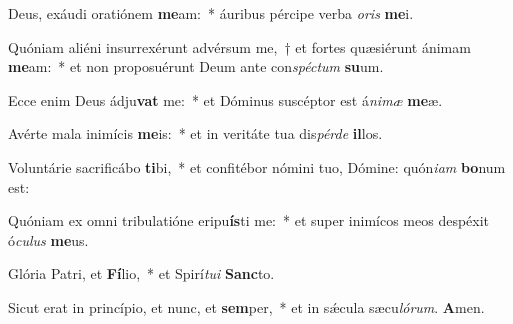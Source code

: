 \vs Deus, exáudi oratiónem \textbf{me}am:~* áuribus pércipe verba \textit{o}\textit{ris} \textbf{me}i.

\vs Quóniam aliéni insurrexérunt advérsum me,~† et fortes quæsiérunt ánimam \textbf{me}am:~* et non proposuérunt Deum ante con\textit{spéc}\textit{tum} \textbf{su}um.

\vs Ecce enim Deus ádju\textbf{vat} me:~* et Dóminus suscéptor est á\textit{ni}\textit{mæ} \textbf{me}æ.

\vs Avérte mala inimícis \textbf{me}is:~* et in veritáte tua dis\textit{pér}\textit{de} \textbf{il}los.

\vs Voluntárie sacrificábo \textbf{ti}bi,~* et confitébor nómini tuo, Dómine: quón\textit{i}\textit{am} \textbf{bo}num est:

\vs Quóniam ex omni tribulatióne eripu\textbf{ís}ti me:~* et super inimícos meos despéxit ó\textit{cu}\textit{lus} \textbf{me}us.

\vs Glória Patri, et \textbf{Fí}lio,~* et Spirí\textit{tu}\textit{i} \textbf{Sanc}to.

\vs Sicut erat in princípio, et nunc, et \textbf{sem}per,~* et in sǽcula sæcu\textit{ló}\textit{rum}. \textbf{A}men.


